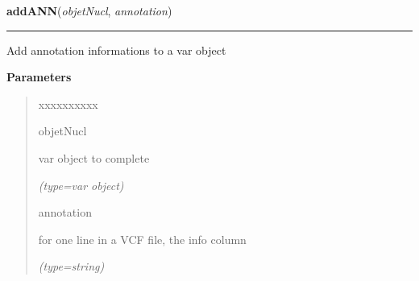 \hspace{.8\funcindent}\begin{boxedminipage}{\funcwidth}

    \raggedright \textbf{addANN}(\textit{objetNucl}, \textit{annotation})

    \vspace{-1.5ex}

    \rule{\textwidth}{0.5\fboxrule}
\setlength{\parskip}{2ex}
    Add annotation informations to a var object

\setlength{\parskip}{1ex}
      \textbf{Parameters}
      \vspace{-1ex}

      \begin{quote}
        \begin{Ventry}{xxxxxxxxxx}

          \item[objetNucl]

          var object to complete

            {\it (type=var object)}

          \item[annotation]

          for one line in a VCF file, the info column

            {\it (type=string)}

        \end{Ventry}

      \end{quote}

    \end{boxedminipage}

    \label{script-FixedVar:readVCFfile}

    \vspace{0.5ex}

